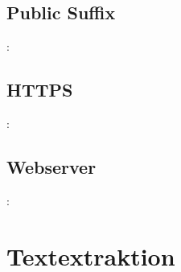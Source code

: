 \documentclass[12pt, utf8, ngerman]{beamer}
\begin{document}
\subsection{Public Suffix}
\begin{frame}{\insertsection: \insertsubsection}
\end{frame}

\subsection{HTTPS}
\begin{frame}{\insertsection: \insertsubsection}
\end{frame}

\subsection{Webserver}
\begin{frame}{\insertsection: \insertsubsection}
\end{frame}


\section{Textextraktion}

\begin{frame}{\insertsection}
\end{frame}
\end{document}
